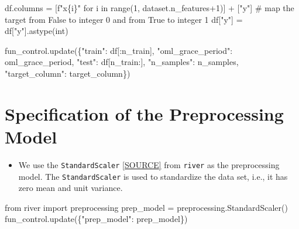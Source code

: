 \documentclass[
  letterpaper,
  DIV=11,
  numbers=noendperiod]{scrreprt}
\newenvironment{Shaded}{\begin{snugshade}}{\end{snugshade}}
\newcommand{\BuiltInTok}[1]{\textcolor[rgb]{0.00,0.23,0.31}{#1}}
\newcommand{\CommentTok}[1]{\textcolor[rgb]{0.37,0.37,0.37}{#1}}
\newcommand{\ControlFlowTok}[1]{\textcolor[rgb]{0.00,0.23,0.31}{#1}}
\newcommand{\DecValTok}[1]{\textcolor[rgb]{0.68,0.00,0.00}{#1}}
\newcommand{\ImportTok}[1]{\textcolor[rgb]{0.00,0.46,0.62}{#1}}
\newcommand{\KeywordTok}[1]{\textcolor[rgb]{0.00,0.23,0.31}{#1}}
\newcommand{\NormalTok}[1]{\textcolor[rgb]{0.00,0.23,0.31}{#1}}
\newcommand{\OperatorTok}[1]{\textcolor[rgb]{0.37,0.37,0.37}{#1}}
\newcommand{\SpecialCharTok}[1]{\textcolor[rgb]{0.37,0.37,0.37}{#1}}
\newcommand{\SpecialStringTok}[1]{\textcolor[rgb]{0.13,0.47,0.30}{#1}}
\newcommand{\StringTok}[1]{\textcolor[rgb]{0.13,0.47,0.30}{#1}}
\providecommand{\tightlist}{%
  \setlength{\itemsep}{0pt}\setlength{\parskip}{0pt}}\usepackage{longtable,booktabs,array}
\begin{document}
\begin{Shaded}
\begin{Highlighting}[]
\NormalTok{df.columns }\OperatorTok{=}\NormalTok{ [}\SpecialStringTok{f"x}\SpecialCharTok{\{}\NormalTok{i}\SpecialCharTok{\}}\SpecialStringTok{"} \ControlFlowTok{for}\NormalTok{ i }\KeywordTok{in} \BuiltInTok{range}\NormalTok{(}\DecValTok{1}\NormalTok{, dataset.n\_features}\OperatorTok{+}\DecValTok{1}\NormalTok{)] }\OperatorTok{+}\NormalTok{ [}\StringTok{"y"}\NormalTok{]}
\CommentTok{\# map the target from False to integer 0 and from True to integer 1}
\NormalTok{df[}\StringTok{"y"}\NormalTok{] }\OperatorTok{=}\NormalTok{ df[}\StringTok{"y"}\NormalTok{].astype(}\BuiltInTok{int}\NormalTok{)}

\NormalTok{fun\_control.update(\{}\StringTok{"train"}\NormalTok{:  df[:n\_train],}
                    \StringTok{"oml\_grace\_period"}\NormalTok{: oml\_grace\_period,}
                    \StringTok{"test"}\NormalTok{:  df[n\_train:],}
                    \StringTok{"n\_samples"}\NormalTok{: n\_samples,}
                    \StringTok{"target\_column"}\NormalTok{: target\_column\})}
\end{Highlighting}
\end{Shaded}

\hypertarget{specification-of-the-preprocessing-model-2}{%
\section{Specification of the Preprocessing
Model}\label{specification-of-the-preprocessing-model-2}}

\begin{itemize}
\tightlist
\item
  We use the \texttt{StandardScaler}
  \href{https://riverml.xyz/dev/api/preprocessing/StandardScaler/}{{[}SOURCE{]}}
  from \texttt{river} as the preprocessing model. The
  \texttt{StandardScaler} is used to standardize the data set, i.e., it
  has zero mean and unit variance.
\end{itemize}

\begin{Shaded}
\begin{Highlighting}[]
\ImportTok{from}\NormalTok{ river }\ImportTok{import}\NormalTok{ preprocessing}
\NormalTok{prep\_model }\OperatorTok{=}\NormalTok{ preprocessing.StandardScaler()}
\NormalTok{fun\_control.update(\{}\StringTok{"prep\_model"}\NormalTok{: prep\_model\})}
\end{Highlighting}
\end{Shaded}
\end{document}
